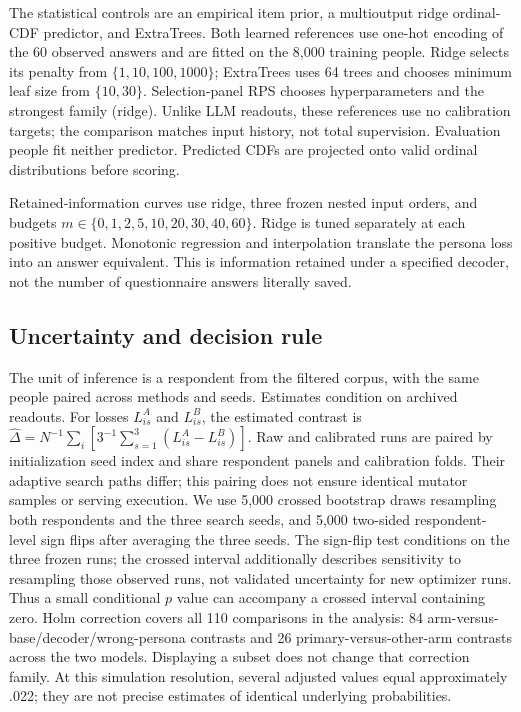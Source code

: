 \documentclass[sigconf,anonymous]{aamas}
\begin{document}
The statistical controls are an empirical item prior, a multioutput ridge
ordinal-CDF predictor, and ExtraTrees. Both learned references use one-hot
encoding of the 60 observed answers and are fitted on the 8,000 training
people. Ridge selects its penalty from $\{1,10,100,1000\}$; ExtraTrees uses
64 trees and chooses minimum leaf size from $\{10,30\}$. Selection-panel RPS
chooses hyperparameters and the strongest family (ridge). Unlike LLM readouts,
these references use no calibration targets; the comparison matches input
history, not total supervision. Evaluation people fit neither predictor.
Predicted CDFs are projected onto valid ordinal distributions before scoring.

Retained-information curves use ridge, three frozen nested input orders,
and budgets $m\in\{0,1,2,5,10,20,30,40,60\}$. Ridge is tuned separately at
each positive budget. Monotonic regression and interpolation translate the
persona loss into an answer equivalent. This is information retained under
a specified decoder, not the number of questionnaire answers literally saved.

\subsection{Uncertainty and decision rule}
The unit of inference is a respondent from the filtered corpus, with the same
people paired across methods and seeds. Estimates condition on archived readouts. For losses $L_{is}^{A}$ and $L_{is}^{B}$, the estimated
contrast is $\widehat\Delta=N^{-1}\sum_i[3^{-1}\sum_{s=1}^{3}
(L_{is}^{A}-L_{is}^{B})]$. Raw and calibrated runs are paired by initialization
seed index and share respondent panels and calibration folds. Their adaptive
search paths differ; this pairing does not ensure identical mutator samples
or serving execution. We use 5,000 crossed bootstrap draws resampling both
respondents and the three search seeds, and 5,000 two-sided respondent-level
sign flips after averaging the three seeds. The sign-flip test conditions on the three frozen runs; the crossed interval
additionally describes sensitivity to resampling those observed runs, not
validated uncertainty for new optimizer runs. Thus a
small conditional $p$ value can accompany a crossed interval containing zero. Holm correction covers all 110 comparisons in the
analysis: 84 arm-versus-base/decoder/wrong-persona contrasts and 26
primary-versus-other-arm contrasts across the two models. Displaying a subset
does not change that correction family. At this simulation resolution,
several adjusted values equal approximately .022; they are not precise
estimates of identical underlying probabilities.
\end{document}
